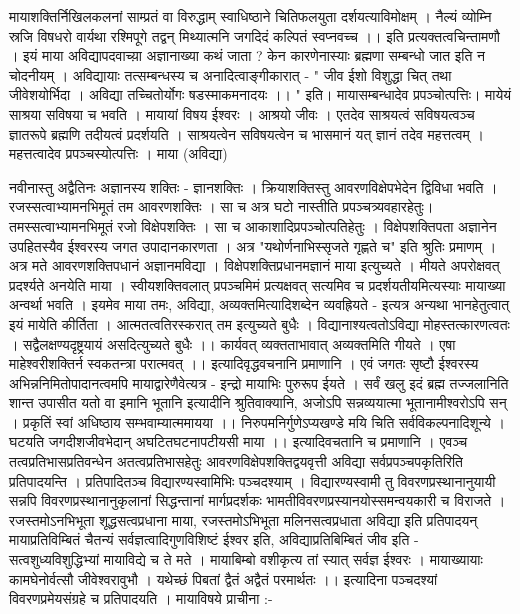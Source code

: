 मायाशक्तिर्निखिलकलनां साम्प्रतं वा विरुद्धाम् 
स्वाधिष्ठाने चितिफलयुता दर्शयत्याविमोक्षम् । 
नैल्यं व्योम्नि स्रजि विषधरो वार्यथा रश्मिपूगे 
तद्वन् मिथ्यात्मनि जगदिदं कल्पितं स्वप्नवच्च ।। 
इति  प्रत्यक्तत्वचिन्तामणौ । इयं माया अविद्यापदवाच्य़ा अज्ञानाख्या कथं जाता ? केन कारणेनास्याः ब्रह्मणा सम्बन्धो जात इति न चोदनीयम् । अविद्यायाः तत्सम्बन्धस्य च अनादित्वाङ्गीकारात् - 
" जीव ईशो विशुद्धा चित् तथा जीवेशयोर्भिदा ।
अविद्या तच्चितोर्योगः षडस्माकमनादयः ।। "
इति। मायासम्बन्धादेव प्रपञ्चोत्पत्तिः। मायेयं साश्रया सविषया च भवति । मायायां विषय ईश्वरः । आश्रयो जीवः । एतदेव साश्रयत्वं सविषयत्वञ्च ज्ञातरूपे ब्रह्मणि तदीयत्वं प्रदर्शयति । साश्रयत्वेन सविषयत्वेन च भासमानं यत् ज्ञानं तदेव महत्तत्वम् । महत्तत्वादेव प्रपञ्चस्योत्पत्तिः । 
माया (अविद्या)

नवीनास्तु अद्वैतिनः अज्ञानस्य शक्तिः - ज्ञानशक्तिः । क्रियाशक्तिस्तु आवरणविक्षेपभेदेन द्विविधा भवति । रजस्सत्वाभ्यामनभिमूतं तम आवरणशक्तिः । सा च अत्र घटो नास्तीति प्रपञ्चत्र्यवहारहेतुः। तमस्सत्वाभ्यामनभिमूतं रजो विक्षेपशक्तिः । सा च आकाशादिप्रपञ्चोत्पतिहेतुः । विक्षेपशक्तिपता अज्ञानेन उपहितस्यैव ईश्वरस्य जगत उपादानकारणता । अत्र "यथोर्णनाभिस्सृजते गृह्णते च" इति श्रुतिः प्रमाणम् । अत्र मते आवरणशक्तिपधानं अज्ञानमविद्या । विक्षेपशक्तिप्रधानमज्ञानं माया इत्युच्यते । मीयते अपरोक्षवत् प्रदर्श्यते अनयेति माया । स्वीयशक्तिवलात् प्रपञ्चमिमं प्रत्यक्षवत् सत्यमिव च प्रदर्शयतीयमित्यस्याः मायाख्या अन्वर्था भवति । इयमेव माया तमः, अविद्या, अव्यक्तमित्यादिशब्देन व्यवह्रियते - इत्यत्र 
अन्यथा भानहेतुत्वात् इयं मायेति कीर्तिता ।
आत्मतत्वतिरस्करात् तम इत्युच्यते बुधैः ।
विद्यानाश्यत्वतोऽविद्या मोहस्तत्कारणत्वतः ।
सद्वैलक्षण्यदृष्ट्रयायं असदित्युच्यते बुधैः ।। 
कार्यवत् व्यक्तताभावात् अव्यक्तमिति गीयते ।
एषा माहेश्वरीशक्तिर्न स्वकतन्त्रा परात्मवत् ।। 
इत्यादिवृद्धवचनानि प्रमाणानि । एवं जगतः सृष्टौ ईश्वरस्य अभिन्ननिमितोपादानत्वमपि मायाद्वारेणैवेत्यत्र - इन्द्रो मायाभिः पुरुरूप ईयते । सर्वं खलु इदं ब्रह्म तज्जलानिति शान्त उपासीत यतो वा इमानि भूतानि इत्यादीनि श्रुतिवाक्यानि, 
अजोऽपि सन्नव्ययात्मा भूतानामीश्वरोऽपि सन् ।
प्रकृतिं स्वां अधिष्ठाय सम्भवाम्यात्ममायया ।। 
निरुपमनिर्गुणेऽप्यखण्डे मयि चिति सर्वविकल्पनादिशून्ये । 
घटयति जगदीशजीवभेदान् अघटितघटनापटीयसी माया ।।
इत्यादिवचतानि च प्रमाणानि । एवञ्च तत्वप्रतिभासप्रतिवन्धेन अतत्वप्रतिभासहेतुः आवरणविक्षेपशक्तिद्वयवृत्ती अविद्या सर्वप्रपञ्चपकृतिरिति प्रतिपादयन्ति । प्रतिपादितञ्च विद्यारण्यस्वामिभिः पञ्चदश्याम् । विद्यारण्यस्वामी तु विवरणप्रस्थानानुयायी सन्नपि विवरणप्रस्थानानुकृलानां सिद्धन्तानां मार्गप्रदर्शकः भामतीविवरणप्रस्यानयोस्समन्वयकारी च विराजते । रजस्तमोऽनभिभूता शूद्धसत्वप्रधाना माया, रजस्तमोऽभिभूता मलिनसत्वप्रधाता अविद्या इति प्रतिपादयन् मायाप्रतिविम्बितं चैतन्यं सर्वज्ञत्वादिगुणविशिष्टं ईश्वर इति, अविद्याप्रतिबिम्बितं जीव इति - 
सत्वशुध्यविशुद्धिभ्यां मायाविद्ये च ते मते । 
मायाबिम्बो वशीकृत्य तां स्यात् सर्वज्ञ ईश्वरः ।
मायाख्यायाः कामघेनोर्वत्सौ जीवेश्वरावुभौ । 
यथेच्छं पिबतां द्वैतं अद्वैतं परमार्थतः ।। इत्यादिना पञ्चदश्यां विवरणप्रमेयसंग्रहे च प्रतिपादयति ।
मायाविषये प्राचीना :-

